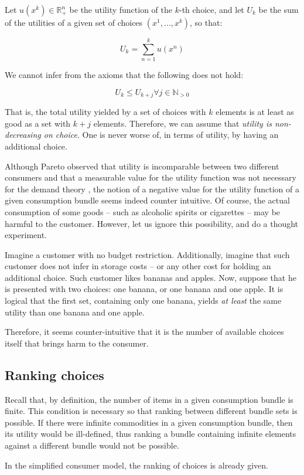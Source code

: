 \documentclass[12pt, letterpaper]{article}
\begin{document}
	Let $u(x^k) \in \mathbb{R}_+^n$ be the utility function of the $k$-th choice, and let $U_k$ be the sum of the utilities of a given set of choices $(x^1, \dots , x^k)$, so that:
	 
	\[ U_k = \sum_{n=1}^{k} u(x^n) \]
	
	We cannot infer from the axioms that the following does not hold:  
	
	\begin{equation}
		U_k \leq U_{k+j} \forall j \in \mathbb{N}_{> 0}
	\end{equation}

	That is, the total utility yielded by a set of choices with $k$ elements is at least as good as a set with $k+j$ elements. Therefore, we can assume that \textit{utility is non-decreasing on choice}. One is never worse of, in terms of utility, by having an additional choice. 

	Although Pareto observed that utility is incomparable between two different consumers and that a measurable value for the utility function was not necessary for the demand theory \cite{pareto1897}, the notion of a negative value for the utility function of a given consumption bundle seems indeed counter intuitive. Of course, the actual consumption of some goods -- such as alcoholic spirits or cigarettes -- may be harmful to the customer. However, let us ignore this possibility, and do a thought experiment. 
	
	Imagine a customer with no budget restriction. Additionally, imagine that such customer does not infer in storage costs -- or any other cost for holding an additional choice. Such customer likes bananas and apples. Now, suppose that he is presented with two choices: one banana, or one banana and one apple. It is logical that the first set, containing only one banana, yields \textit{at least} the same utility than one banana and one apple.
	
	Therefore, it seems counter-intuitive that it is the number of available choices itself that brings harm to the consumer.
	
	\subsection{Ranking choices}
	Recall that, by definition, the number of items in a given consumption bundle is finite. This condition is necessary so that ranking between different bundle sets is possible. If there were infinite commodities in a given consumption bundle, then its utility would be ill-defined, thus ranking a bundle containing infinite elements against a different bundle would not be possible.
	
	In the simplified consumer model, the ranking of choices is already given.




\end{document}
